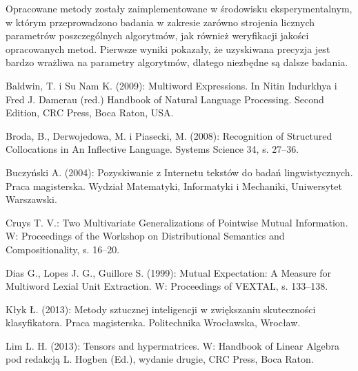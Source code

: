 \documentclass[11pt,a4paper]{llncs}
\begin{document}
Opracowane metody zostały zaimplementowane w środowisku eksperymentalnym, w którym przeprowadzono badania w zakresie zarówno strojenia licznych parametrów poszczególnych algorytmów, jak również weryfikacji jakości opracowanych metod. Pierwsze wyniki pokazały, że uzyskiwana precyzja jest bardzo wrażliwa na parametry algorytmów, dlatego niezbędne są dalsze badania.

\begin{thebibliography}{4}

 Baldwin, T. i Su Nam K. (2009): Multiword Expressions. In Nitin Indurkhya i Fred J. Damerau (red.) Handbook of Natural Language Processing. Second Edition, CRC Press, Boca Raton, USA.


 Broda, B., Derwojedowa, M. i Piasecki, M. (2008): Recognition of Structured Collocations in An Inflective Language. Systems Science 34, s. 27--36.

	Buczyński A. (2004): Pozyskiwanie z Internetu tekstów do badań lingwistycznych. Praca magisterska.
	Wydział Matematyki, Informatyki i Mechaniki, 	Uniwersytet Warszawski.

	Cruys T. V.: Two Multivariate Generalizations of Pointwise Mutual Information. W: Proceedings of the Workshop on Distributional Semantics and Compositionality, s. 16--20.

Dias G., Lopes J. G., Guillore S. (1999): Mutual Expectation: A Measure for Multiword Lexial Unit Extraction. W: Proceedings of VEXTAL, s. 133--138.
	



	Kłyk Ł. (2013): Metody sztucznej inteligencji w zwiększaniu skuteczności klasyfikatora. Praca magisterska.
	Politechnika Wrocławska, 	Wrocław.

	Lim L. H. (2013): Tensors and hypermatrices. W: Handbook of Linear Algebra pod redakcją L. Hogben (Ed.), 
	wydanie drugie, 
	CRC Press, Boca Raton.
		

\end{thebibliography}
\end{document}

